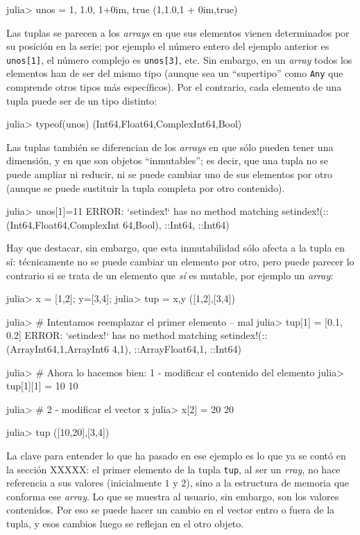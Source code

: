 ﻿\documentclass{article}
\newcommand{\code}{\texttt}
\begin{document}
{julia> unos = 1, 1.0, 1+0im, true
(1,1.0,1 + 0im,true)

Las tuplas se parecen a los \emph{arrays} en que sus elementos vienen determinados por su posición en la serie; por ejemplo el número entero del ejemplo anterior es \code{unos[1]}, el número complejo es \code{unos[3]}, etc. Sin embargo, en un \emph{array} todos los elementos han de ser del mismo tipo (aunque sea un ``supertipo'' como \code{Any} que comprende otros tipos más específicos). Por el contrario, cada elemento de una tupla puede ser de un tipo distinto: 

julia> typeof(unos)
(Int64,Float64,Complex{Int64},Bool)

Las tuplas también se diferencian de los \emph{arrays} en que sólo pueden tener una dimensión, y en que son objetos ``inmutables''; es decir, que una tupla no se puede ampliar ni reducir, ni se puede cambiar uno de sus elementos por otro (aunque se puede sustituir la tupla completa por otro contenido).

julia> unos[1]=11
ERROR: `setindex!` has no method matching setindex!(::(Int64,Float64,Complex{Int
64},Bool), ::Int64, ::Int64)

Hay que destacar, sin embargo, que esta inmutabilidad sólo afecta a la tupla en sí: técnicamente no se puede cambiar un elemento por otro, pero puede parecer lo contrario si se trata de un elemento que \emph{sí} es mutable, por ejemplo un \emph{array}:

julia> x = [1,2]; y=[3,4];
julia> tup = x,y
([1,2],[3,4])

julia> # Intentamos reemplazar el primer elemento -- mal
julia> tup[1] = [0.1, 0.2]
ERROR: `setindex!` has no method matching setindex!(::(Array{Int64,1},Array{Int6
4,1}), ::Array{Float64,1}, ::Int64)

julia> # Ahora lo hacemos bien: 1 - modificar el contenido del elemento
julia> tup[1][1] = 10
10

julia> # 2 - modificar el vector x
julia> x[2] = 20
20

julia> tup
([10,20],[3,4])

La clave para entender lo que ha pasado en ese ejemplo es lo que ya se contó en la sección XXXXX: el primer elemento de la tupla \code{tup}, al ser un \emph{rray}, no hace referencia a sus valores (inicialmente $1$ y $2$), sino a la estructura de memoria que conforma ese \emph{array}. Lo que se muestra al usuario, sin embargo, son los valores contenidos. Por eso se puede hacer un cambio en el vector entro o fuera de la tupla, y esos cambios luego se reflejan en el otro objeto.

}
\end{document}
